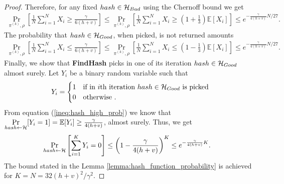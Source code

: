 \begin{proof}
Therefore, for any fixed $hash \in \mathcal{H}_{Bad}$ using the Chernoff bound we get
\begin{align*}
  \underset{\pi^{(k)},\rho}{\Pr} \left[\frac{1}{N} \sum_{i=1}^{N} X_i \geq \frac{\gamma}{6(h+v)} \right] \leq
  \underset{\pi^{(k)}, \rho}{\Pr}\left[\frac{1}{N} \sum_{i=1}^{N} X_i \geq (1 + \frac{1}{3}) \mathbb{E}[X_i]\right] \leq
  e^{-{\frac{\gamma}{4(h+v)}} N /27}.
\end{align*}
%
The probability that $hash \in \mathcal{H}_{Good}$, when picked, is not returned amounts
\begin{align*}
  \underset{\pi^{(k)}, \rho}{\Pr}\left[\frac{1}{N} \sum_{i=1}^{N} X_i \leq \frac{\gamma}{6(h+v)}\right] \leq
  \underset{\pi^{(k)}, \rho}{\Pr}\left[\frac{1}{N} \sum_{i=1}^{N} X_i \leq (1 - \frac{1}{3})\mathbb{E}[X_i]\right] \leq e^{-{\frac{\gamma}{4(h+v)}} N /27}.
\end{align*}
%
Finally, we show that \textbf{FindHash} picks in one of its iteration $hash \in \mathcal{H}_{Good}$ almost surely.
Let $Y_i$ be a binary random variable such that
\begin{align*}
  Y_i =
  \begin{cases}
    1 & \text{if in $i$th iteration $hash \in \mathcal{H}_{Good}$ is picked} \\
    0 & \text{otherwise .}
  \end{cases}
\end{align*}
From equation (\ref{ineq:hash_high_prob}) we know that $\underset{hash \leftarrow \mathcal{H}}{\Pr}[Y_i = 1] = \mathbb{E}[Y_i] \geq \frac{\gamma}{4(h+v)}$, almost surely.
Thus, we get
\begin{align*}
  \underset{hash \leftarrow \mathcal{H}}{\Pr}\left[\sum_{i=1}^{K} Y_i = 0\right] &\leq \left(1 - \frac{\gamma}{4(h+v)}\right)^{K} \leq e^{-\frac{\gamma}{4(h+v)} K}.
\end{align*}
The bound stated in the Lemma \ref{lemma:hash_function_probability} is achieved for $K = N = 32(h+v)^2/\gamma^2$.
\end{proof}
